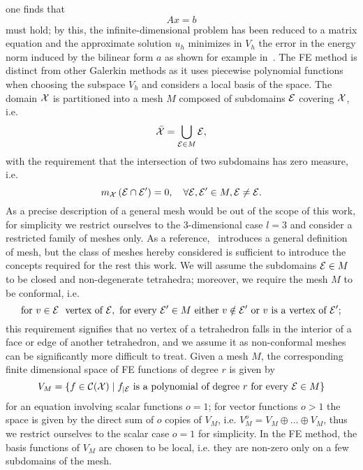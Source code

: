 one finds that
\begin{equation}\label{eq:Galerkin-formulation}
    Ax = b
\end{equation}
must hold; by this, the infinite-dimensional problem has been reduced to a matrix equation and the approximate solution $u_h$ minimizes in $V_h$ the error in the energy norm induced by the bilinear form $a$ as shown for example in~\cite[Theorem 4.3]{DeuflhardWeiser2012}.\newline
The FE method is distinct from other Galerkin methods as it uses piecewise polynomial functions when choosing the subspace $V_h$ and considers a local basis of the space.
The domain $\mathcal X$ is partitioned into a mesh $M$ composed of subdomains $\mathcal E$ covering $\mathcal X$, i.e.
\[
    \bar{\mathcal X} = \bigcup_{\mathcal E \in M} \mathcal E,
\]
with the requirement that the intersection of two subdomains has zero measure, i.e. 
\[
    m_{\mathcal X}\left(\mathcal E \cap \mathcal E'\right) = 0, \quad \forall \mathcal E, \mathcal E' \in M, \mathcal E \neq \mathcal E.
\]
As a precise description of a general mesh would be out of the scope of this work, for simplicity we restrict ourselves to the 3-dimensional case $l=3$ and consider a restricted family of meshes only.
As a reference,~\cite[Chapter 4.3]{DeuflhardWeiser2012} introduces a general definition of mesh, but the class of meshes hereby considered is sufficient to introduce the concepts required for the rest this work.
We will assume the subdomains $\mathcal E \in M$ to be closed and non-degenerate tetrahedra; moreover, we require the mesh $M$ to be conformal, i.e. 
\[
 \text{for } v \in \mathcal E \ \text{ vertex of } \mathcal E, \text{ for every } \mathcal E' \in M \text{ either } v \notin \mathcal E' \text{ or } v \text{ is a vertex of } \mathcal E';
\]
this requirement signifies that no vertex of a tetrahedron falls in the interior of a face or edge of another tetrahedron, and we assume it as non-conformal meshes can be significantly more difficult to treat. \newline
Given a mesh $M$, the corresponding finite dimensional space of FE functions of degree $r$ is given by 
\[
    V_M = \{ f\in \mathcal C(\mathcal X) \mid f_{\mid \mathcal E} \text{ is a polynomial of degree } r \text{ for every } \mathcal E \in M \}
\]  
for an equation involving scalar functions $o=1$; for vector functions $o>1$ the space is given by the direct sum of $o$ copies of $V_M$, i.e. $V_M^o = V_M \oplus \dots \oplus V_M$, thus we restrict ourselves to the scalar case $o=1$ for simplicity. \newline
In the FE method, the basis functions of $V_M$ are chosen to be local, i.e. they are non-zero only on a few subdomains of the mesh.

